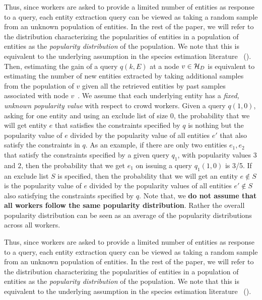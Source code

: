 Thus, since workers are asked to provide a limited number of entities as response to a query, each entity extraction query can be viewed as taking a random sample from an unknown population of entities. In the rest of the paper, we will refer to the distribution characterizing the popularities of entities in a population of entities as the {\em popularity distribution} of the population. We note that this is equivalent to the underlying assumption in the species estimation literature~\cite{chao:1992} (). Then, estimating the gain of a query $q(k,E)$ at a node $v \in \mathcal{H}_D$ is equivalent to estimating the number of new entities extracted by taking additional samples from the population of $v$ given all the retrieved entities by past samples associated with node $v$~\cite{trushkowsky:2013}. 
\fi
\iftr
{} We assume that each underlying entity has a {\em fixed, unknown popularity value} with respect to crowd workers. Given a query $q(1, 0)$, asking for one entity and using an exclude list of size $0$, the probability that we will get entity $e$ that satisfies the constraints specified by $q$ is nothing but the popularity value of $e$ divided by the popularity value of all entities $e'$ that also satisfy the constraints in $q$. As an example, if there are only two entities $e_1, e_2$ that satisfy the constraints specified by a given query $q_1$, with popularity values $3$ and $2$,
then the probability that we get $e_1$ on issuing a query $q_1(1, 0)$ is 3/5. 
If an exclude list $S$ is specified, then the probability that we will get an entity $e \notin S$ is the popularity value of $e$ divided by the popularity values of all entities $e' \notin S$ also satisfying the constraints specified by $q$. Note that, we {\bf do not assume that all workers follow the same popularity distribution}. Rather the overall popularity distribution can be seen as an average of the popularity distributions across all workers.

Thus, since workers are asked to provide a limited number of entities as response to a query, each entity extraction query can be viewed as taking a random sample from an unknown population of entities. In the rest of the paper, we will refer to the distribution characterizing the popularities of entities in a population of entities as the {\em popularity distribution} of the population. We note that this is equivalent to the underlying assumption in the species estimation literature~\cite{chao:1992} ().

